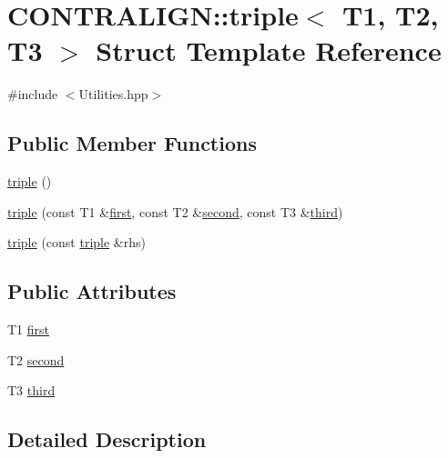 \hypertarget{struct_c_o_n_t_r_a_l_i_g_n_1_1triple}{\section{C\+O\+N\+T\+R\+A\+L\+I\+G\+N\+:\+:triple$<$ T1, T2, T3 $>$ Struct Template Reference}
\label{struct_c_o_n_t_r_a_l_i_g_n_1_1triple}
}


{\ttfamily \#include $<$Utilities.\+hpp$>$}

\subsection*{Public Member Functions}
\begin{DoxyCompactItemize}
\item 
\hyperlink{struct_c_o_n_t_r_a_l_i_g_n_1_1triple_a3bdf8136df773fff422b4cbb354cf749}{triple} ()
\item 
\hyperlink{struct_c_o_n_t_r_a_l_i_g_n_1_1triple_a8da4925a9c7fe1816a9518d026131ecc}{triple} (const T1 \&\hyperlink{struct_c_o_n_t_r_a_l_i_g_n_1_1triple_a28cd5ceccab23ab8628d2c5e40147c44}{first}, const T2 \&\hyperlink{struct_c_o_n_t_r_a_l_i_g_n_1_1triple_a332bdb4bd1b4f90c53bec3c7e6bd41ff}{second}, const T3 \&\hyperlink{struct_c_o_n_t_r_a_l_i_g_n_1_1triple_a1ca35d32af351799a3b1132ad6f9ecfd}{third})
\item 
\hyperlink{struct_c_o_n_t_r_a_l_i_g_n_1_1triple_adc74ee1260c2379a96f07a9182c0ad9a}{triple} (const \hyperlink{struct_c_o_n_t_r_a_l_i_g_n_1_1triple}{triple} \&rhs)
\end{DoxyCompactItemize}
\subsection*{Public Attributes}
\begin{DoxyCompactItemize}
\item 
T1 \hyperlink{struct_c_o_n_t_r_a_l_i_g_n_1_1triple_a28cd5ceccab23ab8628d2c5e40147c44}{first}
\item 
T2 \hyperlink{struct_c_o_n_t_r_a_l_i_g_n_1_1triple_a332bdb4bd1b4f90c53bec3c7e6bd41ff}{second}
\item 
T3 \hyperlink{struct_c_o_n_t_r_a_l_i_g_n_1_1triple_a1ca35d32af351799a3b1132ad6f9ecfd}{third}
\end{DoxyCompactItemize}


\subsection{Detailed Description}
